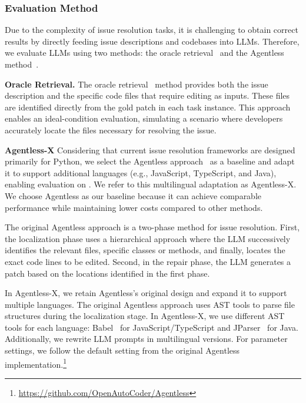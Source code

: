 \subsubsection{Evaluation Method}  
Due to the complexity of issue resolution tasks, it is challenging to obtain correct results by directly feeding issue descriptions and codebases into LLMs. Therefore, we evaluate LLMs  using two methods: the oracle retrieval~\cite{jimenez2023swe,tao2024magis} and the Agentless method~\cite{xia2024agentless}.

\textbf{Oracle Retrieval.} The oracle retrieval~\cite{tao2024magis,jimenez2023swe} method provides both the issue description and the specific code files that require editing as inputs. These files are identified directly from the gold patch in each task instance. This approach enables an ideal-condition evaluation, simulating a scenario where developers accurately locate the files necessary for resolving the issue.



\textbf{Agentless-X} 
Considering that current issue resolution frameworks are designed primarily for Python, we select the Agentless approach~\cite{xia2024agentless} as a baseline and adapt it to support additional languages (e.g., JavaScript, TypeScript, and Java), enabling evaluation on \Swebenchx. We refer to this multilingual adaptation as Agentless-X. We choose Agentless as our baseline because it can achieve comparable performance while maintaining lower costs compared to other methods.

The original Agentless approach is a two-phase method for issue resolution. First, the localization phase uses a hierarchical approach where the LLM successively identifies the relevant files, specific classes or methods, and finally, locates the exact code lines to be edited. Second, in the  repair phase, the LLM generates a patch based on the locations identified in the first phase.

In Agentless-X, we retain Agentless's original design and expand it to support multiple languages. The original Agentless approach uses AST tools to parse file structures during the localization stage. In Agentless-X, we use different AST tools for each language: Babel~\cite{babel} for JavaScript/TypeScript and JParser~\cite{jparser} for Java. Additionally, we rewrite LLM prompts in multilingual versions. For parameter settings, we follow the default setting from the original Agentless implementation.\footnote{\url{https://github.com/OpenAutoCoder/Agentless}}

